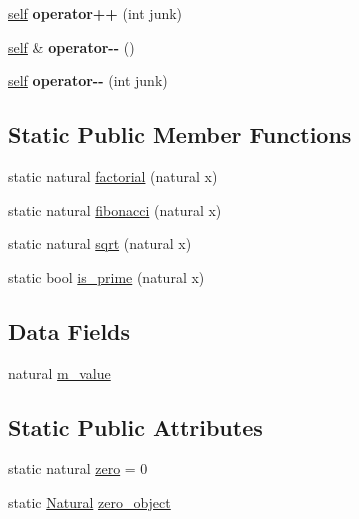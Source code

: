 \begin{DoxyCompactItemize}
\hyperlink{classez_1_1objects_1_1Natural}{self} {\bfseries operator++} (int junk)
\item 
\mbox{\label{classez_1_1objects_1_1Natural_a344536efea5776d77bd830fb40387047}} 
\hyperlink{classez_1_1objects_1_1Natural}{self} \& {\bfseries operator-\/-\/} ()
\item 
\mbox{\label{classez_1_1objects_1_1Natural_ae66879a65bffa48fb4f4cf1e435ecb55}} 
\hyperlink{classez_1_1objects_1_1Natural}{self} {\bfseries operator-\/-\/} (int junk)
\end{DoxyCompactItemize}
\subsection*{Static Public Member Functions}
\begin{DoxyCompactItemize}
\item 
static natural \hyperlink{classez_1_1objects_1_1Natural_a9f7810c41265e58a814dc7f1308bc4a7}{factorial} (natural x)
\item 
static natural \hyperlink{classez_1_1objects_1_1Natural_a2039dd9d59e3ab225d38144cb9226f10}{fibonacci} (natural x)
\item 
static natural \hyperlink{classez_1_1objects_1_1Natural_aa193b02cc2957fd8ec0d98d6e4dfa6e6}{sqrt} (natural x)
\item 
static bool \hyperlink{classez_1_1objects_1_1Natural_a95e1896656977c50d213b85f4d070abf}{is\+\_\+prime} (natural x)
\end{DoxyCompactItemize}
\subsection*{Data Fields}
\begin{DoxyCompactItemize}
\item 
natural \hyperlink{classez_1_1objects_1_1Natural_a57186b9759146ce2f1e2f0e20af49f52}{m\+\_\+value}
\end{DoxyCompactItemize}
\subsection*{Static Public Attributes}
\begin{DoxyCompactItemize}
\item 
static natural \hyperlink{classez_1_1objects_1_1Natural_ab0e800b5402eaaa8ad9427ae11dfd7ec}{zero} = 0
\item 
static \hyperlink{classez_1_1objects_1_1Natural}{Natural} \hyperlink{classez_1_1objects_1_1Natural_a9400b20acb485477bfea74f0937e24e4}{zero\+\_\+object}
\end{DoxyCompactItemize}
